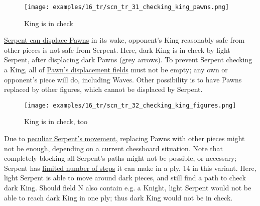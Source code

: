\vspace*{-0.7\baselineskip}
\noindent
\begin{wrapfigure}[15]{l}{0.4\textwidth}
\centering
\texttt{[image: examples/16\_tr/scn\_tr\_31\_checking\_king\_pawns.png]}
\vspace*{-0.7\baselineskip}
\caption{King is in check}
\label{fig:scn_tr_31_checking_king_pawns}
\end{wrapfigure}
\hyperref[fig:scn_tr_19_displacement_init]{Serpent can displace Pawns} in its wake,
opponent's King reasonably safe from other pieces is not safe from Serpent.\newline
\indent
Here, dark King is in check by light Serpent, after displacing dark Pawns (grey
arrows).\newline
\indent
To prevent Serpent checking a King, all of
\hyperref[fig:scn_tr_20_displacement_step_1]{Pawn's displacement fields} must not be
empty; any own or opponent's piece will do, including Waves. Other possibility is to
have Pawns replaced by other figures, which cannot be displaced by Serpent.

\vspace*{-0.3\baselineskip}
\noindent
\begin{wrapfigure}[16]{l}{0.4\textwidth}
\centering
\texttt{[image: examples/16\_tr/scn\_tr\_32\_checking\_king\_figures.png]}
\vspace*{-0.7\baselineskip}
\caption{King is in check, too}
\label{fig:scn_tr_32_checking_king_figures}
\end{wrapfigure}
Due to \hyperref[fig:scn_tr_01_serpent_diagonals]{peculiar Serpent's movement},
replacing Pawns with other pieces might not be enough, depending on a current
chessboard situation.\newline
\indent
Note that completely blocking all Serpent's paths might not be possible, or
necessary; Serpent has \hyperref[fig:scn_tr_05_serpent_end]{limited number of steps}
it can make in a ply, 14 in this variant.\newline
\indent
Here, light Serpent is able to move around dark pieces, and still find a path
to check dark King. Should field N also contain e.g. a Knight, light Serpent
would not be able to reach dark King in one ply; thus dark King would not be in
check.

\clearpage %

